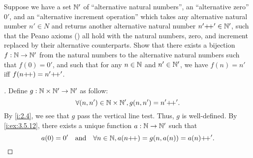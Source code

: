 \begin{ex}\label{i:ex:3.5.13}
  Suppose we have a set \(\mathbb{N}'\) of ``alternative natural numbers'', an ``alternative zero'' \(0'\), and an ``alternative increment operation'' which takes any alternative natural number \(n' \in N\) and returns another alternative natural number \(n'{+}\!{+}' \in \mathbb{N}'\), such that the Peano axioms () all hold with the natural numbers, zero, and increment replaced by their alternative counterparts.
  Show that there exists a bijection \(f : \mathbb{N} \to \mathbb{N}'\) from the natural numbers to the alternative natural numbers such that \(f(0) = 0'\), and such that for any \(n \in \mathbb{N}\) and \(n' \in \mathbb{N}'\), we have \(f(n) = n'\) iff \(f(n{+}\!{+}) = n'{+}\!{+}'\).
\end{ex}

\begin{proof}[]
  Define \(g : \mathbb{N} \times \mathbb{N}' \to \mathbb{N}'\) as follow:
  \[
    \forall (n, n') \in \mathbb{N} \times \mathbb{N}', g(n, n') = n'{+}\!{+}'.
  \]
  By \cref{i:2.4}, we see that \(g\) pass the vertical line test.
  Thus, \(g\) is well-defined.
  By \cref{i:ex:3.5.12}, there exists a unique function \(a : \mathbb{N} \to \mathbb{N}'\) such that
  \[
    a(0) = 0' \quad \text{and} \quad \forall n \in \mathbb{N}, a(n{+}\!{+}) = g(n, a(n)) = a(n){+}\!{+}'.
  \]


\end{proof}
